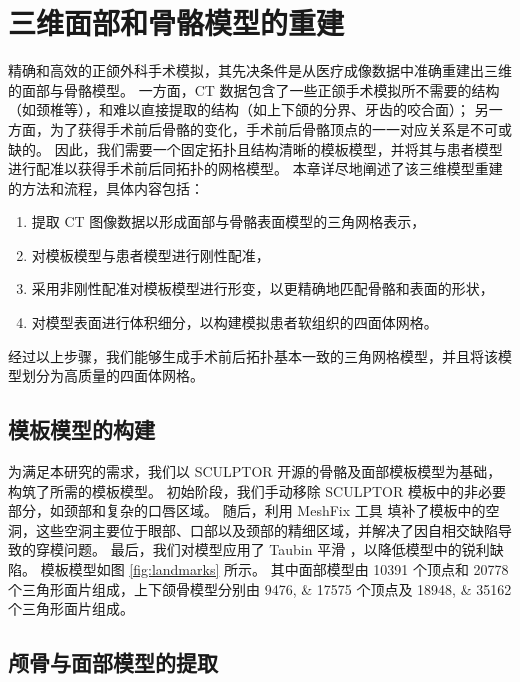 
\chapter{三维面部和骨骼模型的重建}
\label{cha:reconstruction}

精确和高效的正颌外科手术模拟，其先决条件是从医疗成像数据中准确重建出三维的面部与骨骼模型。
一方面，CT 数据包含了一些正颌手术模拟所不需要的结构（如颈椎等），和难以直接提取的结构（如上下颌的分界、牙齿的咬合面）；
另一方面，为了获得手术前后骨骼的变化，手术前后骨骼顶点的一一对应关系是不可或缺的。
因此，我们需要一个固定拓扑且结构清晰的模板模型，并将其与患者模型进行配准以获得手术前后同拓扑的网格模型。
本章详尽地阐述了该三维模型重建的方法和流程，具体内容包括：
\begin{enumerate}
  \item 提取 CT 图像数据以形成面部与骨骼表面模型的三角网格表示，
  \item 对模板模型与患者模型进行刚性配准，
  \item 采用非刚性配准对模板模型进行形变，以更精确地匹配骨骼和表面的形状，
  \item 对模型表面进行体积细分，以构建模拟患者软组织的四面体网格。
\end{enumerate}
经过以上步骤，我们能够生成手术前后拓扑基本一致的三角网格模型，并且将该模型划分为高质量的四面体网格。

\section{模板模型的构建}

为满足本研究的需求，我们以 SCULPTOR \cite{qiuSCULPTORSkeletonconsistentFace2022a} 开源的骨骼及面部模板模型为基础，构筑了所需的模板模型。
初始阶段，我们手动移除 SCULPTOR 模板中的非必要部分，如颈部和复杂的口唇区域。
随后，利用 MeshFix 工具 \cite{atteneLightweightApproachRepairing2010} 填补了模板中的空洞，这些空洞主要位于眼部、口部以及颈部的精细区域，并解决了因自相交缺陷导致的穿模问题。
最后，我们对模型应用了 Taubin 平滑 \cite{vollmerImprovedLaplacianSmoothing1999}，以降低模型中的锐利缺陷。
模板模型如图 \ref{fig:landmarks} 所示。
其中面部模型由 \num{10391} 个顶点和 \num{20778} 个三角形面片组成，上下颌骨模型分别由 \numlist{9476; 17575} 个顶点及 \numlist{18948; 35162} 个三角形面片组成。

\section{颅骨与面部模型的提取}


